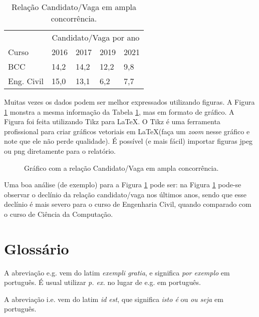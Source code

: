 \documentclass[conference]{IEEEtran}
\begin{document}
\begin{table}[htpb]
\centering
\caption{Relação Candidato/Vaga em ampla concorrência.}
\label{table:amplaConc}
\begin{tabular}{lllll}
 & \multicolumn{4}{c}{Candidato/Vaga por ano} \\\cline{2-5}
Curso                       & 2016      & 2017     & 2019     & 2021     \\\hline
BCC                    & 14,2      & 14,2     & 12,2     & 9,8      \\
Eng. Civil             & 15,0      & 13,1     & 6,2      & 7,7\\\hline
\end{tabular}
\end{table}

Muitas vezes os dados podem ser melhor expressados utilizando figuras. A Figura \ref{fig:amplaConc} monstra a mesma informação da Tabela \ref{table:amplaConc}, mas em formato de gráfico. A Figura foi feita utilizando Tikz para \LaTeX. O Tikz é uma ferramenta profissional para criar gráficos vetoriais em \LaTeX (faça um \textit{zoom} nesse gráfico e note que ele não perde qualidade). É possível (e mais fácil) importar figuras jpeg ou png diretamente para o relatório.

\begin{figure}[htpb]
        \centering
        \setlength\figureheight{3.0cm}
		\setlength\figurewidth{8.0cm}
        
        \caption{Gráfico com a relação Candidato/Vaga em ampla concorrência.}
        \label{fig:amplaConc}
\end{figure}

Uma boa análise (de exemplo) para a Figura \ref{fig:amplaConc} pode ser: na Figura \ref{fig:amplaConc} pode-se observar o declínio da relação candidato/vaga nos últimos anos, sendo que esse declínio é mais severo para o curso de Engenharia Civil, quando comparado com o curso de Ciência da Computação.

\section{Glossário}

A abreviação e.g. vem do latim \textit{exempli gratia}, e significa \textit{por exemplo} em português. É usual utilizar \textit{p. ex.} no lugar de e.g. em português.

A abreviação i.e. vem do latim \textit{id est}, que significa \textit{isto é} ou \textit{ou seja} em português.
\end{document}
